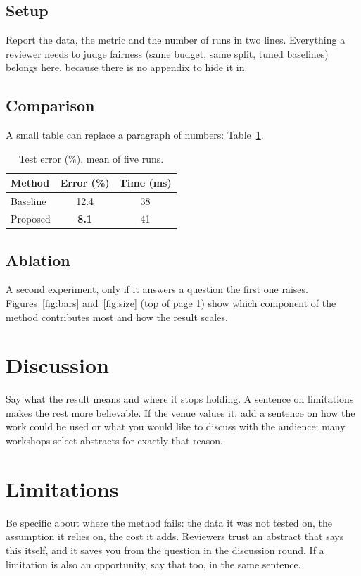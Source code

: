 \documentclass[10pt,a4paper,twocolumn]{article}
\begin{document}
\subsection{Setup}
Report the data, the metric and the number of runs in two lines. Everything a reviewer needs
to judge fairness (same budget, same split, tuned baselines) belongs here, because there is
no appendix to hide it in.

\subsection{Comparison}
A small table can replace a paragraph of numbers: Table~\ref{tab:main}.

\begin{table}[t]
  \centering
  \caption{Test error (\%), mean of five runs.}
  \label{tab:main}
  \begin{tabular}{lcc}
    \toprule
    Method & Error (\%) & Time (ms) \\
    \midrule
    Baseline & 12.4 & 38 \\
    Proposed & \textbf{8.1} & 41 \\
    \bottomrule
  \end{tabular}
\end{table}

\subsection{Ablation}
A second experiment, only if it answers a question the first one raises. Figures~\ref{fig:bars}
and~\ref{fig:size} (top of page 1) show which component of the method contributes most and how the result scales.


\section{Discussion}
Say what the result means and where it stops holding. A sentence on limitations makes the
rest more believable. If the venue values it, add a sentence on how the work could be used
or what you would like to discuss with the audience; many workshops select abstracts for
exactly that reason.

\section{Limitations}
Be specific about where the method fails: the data it was not tested on, the assumption it
relies on, the cost it adds. Reviewers trust an abstract that says this itself, and it saves you from the question
in the discussion round. If a limitation is also an opportunity, say that too, in the same sentence.
\end{document}
